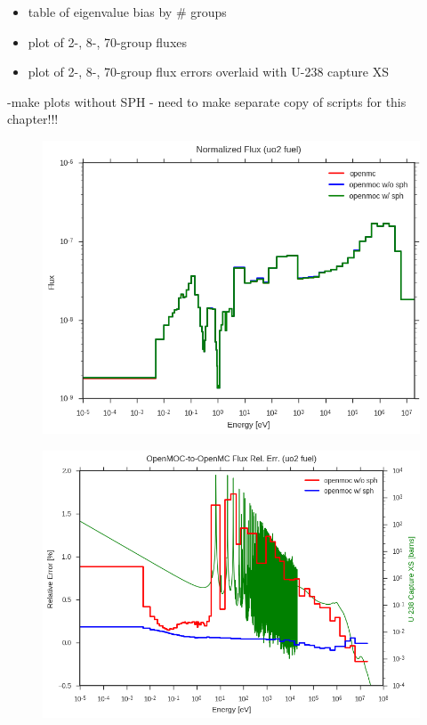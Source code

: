 \begin{itemize}
  \item table of eigenvalue bias by \# groups
  \item plot of 2-, 8-, 70-group fluxes
  \item plot of 2-, 8-, 70-group flux errors overlaid with U-238 capture XS
\end{itemize}

-make plots without SPH - need to make separate copy of scripts for this chapter!!!

\begin{figure}
  \centering
  \includegraphics[width=0.9\linewidth]{figures/biases/pin-cell/flux-uo2-fuel}
  \caption{}
\label{fig:chap2-pin-flux}
\end{figure}

\begin{figure}
  \centering
  \includegraphics[width=0.9\linewidth]{figures/biases/pin-cell/rel-err-uo2-fuel}
  \caption{}
\label{fig:chap2-pin-flux}
\end{figure}



